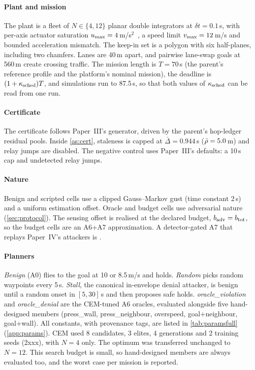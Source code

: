 \paragraph{Plant and mission} The plant is a fleet of $N\in\{4,12\}$
planar double integrators at $\delta t=0.1$\,s, with per-axis actuator
saturation $u_{\max}=4$\,m/s$^2$~\cite{paperIV}, a speed limit
$v_{\max}=12$\,m/s and bounded acceleration mismatch. The keep-in set is a
polygon with six half-planes, including two chamfers. Lanes are 40\,m
apart, and pairwise lane-swap goals at 560\,m create crossing traffic. The
mission length is $T=70$\,s (the parent's reference profile and the
platform's nominal mission), the deadline is $(1+\kappa_{\mathrm{sched}})T$, and
simulations run to 87.5\,s, so that both values of $\kappa_{\mathrm{sched}}$ can be read
from one run.

\paragraph{Certificate} The certificate follows Paper~III's generator,
driven by the parent's hop-ledger residual pools. Inside \cref{as:cert},
staleness is capped at $\bar\Delta=0.944$\,s ($\bar\rho=5.0$\,m) and relay
jumps are disabled. The negative control uses Paper~III's defaults: a 10\,s
cap and undetected relay jumps.

\paragraph{Nature} Benign and scripted cells use a clipped Gauss--Markov
gust (time constant 2\,s) and a uniform estimation offset. Oracle and budget
cells use adversarial nature (\cref{sec:protocol}). The sensing offset is
realised at the declared budget, $b_{\mathrm{adv}}=b_{\mathrm{tot}}$, so the budget cells are an
A6+A7 approximation. A detector-gated A7 that replays Paper~IV's attackers is
\pending.

\paragraph{Planners} \emph{Benign} (A0) flies to the goal at 10 or
8.5\,m/s and holds. \emph{Random} picks random waypoints every 5\,s.
\emph{Stall}, the canonical in-envelope denial attacker, is benign until a
random onset in $[5,30]$\,s and then proposes safe holds.
\emph{oracle\_violation} and \emph{oracle\_denial} are the CEM-tuned A6
oracles, evaluated alongside five hand-designed members (press\_wall,
press\_neighbour, overspeed, goal+neighbour, goal+wall).
All constants, with provenance tags, are listed in \cref{tab:paramsfull} (\cref{app:params}). CEM used 8 candidates, 3 elites, 4 generations and 2 training seeds
(2xxx), with $N=4$ only. The optimum was transferred unchanged to $N=12$.
This search budget is small, so hand-designed members are always evaluated
too, and the worst case per mission is reported.



